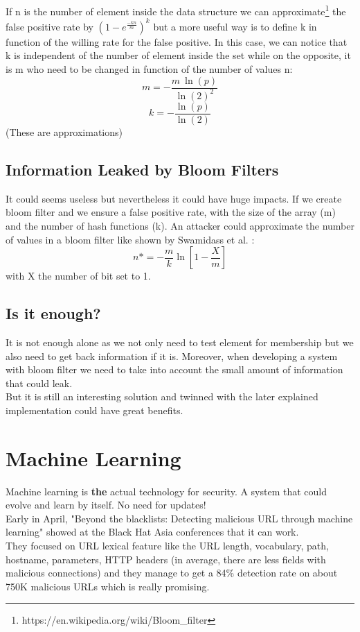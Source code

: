 \documentclass{eplmastersthesis}
\begin{document}
If n is the number of element inside the data structure we can approximate\footnote{https://en.wikipedia.org/wiki/Bloom\_filter} the false positive rate by $(1-e^{\frac{-kn}{m}})^k$ but a more useful way is to define k in function of the willing rate for the false positive. In this case, we can notice that k is independent of the number of element inside the set while on the opposite, it is m who need to be changed in function of the number of values n:
$$m = - \frac{m\ \ln(p)}{\ln(2)^2}$$
$$k = - \frac{\ln(p)}{\ln(2)}$$
(These are approximations)

\subsection{Information Leaked by Bloom Filters}
It could seems useless but nevertheless it could have huge impacts. If we create bloom filter and we ensure a false positive rate, with the size of the array (m) and the number of hash functions (k). An attacker could approximate the number of values in a bloom filter like shown by Swamidass et al. \cite{swamidass2007mathematical}:
$$n* = - \frac{m}{k} \ln\left[1 - \frac{X}{m}\right] $$
with X the number of bit set to 1.\\

\subsection{Is it enough?}
It is not enough alone as we not only need to test element for membership but we also need to get back information if it is. Moreover, when developing a system with bloom filter we need to take into account the small amount of information that could leak. \\
But it is still an interesting solution and twinned with the later explained implementation could have great benefits.

\section{Machine Learning}

Machine learning is \textbf{the} actual technology for security. A system that could evolve and learn by itself. No need for updates! \\
Early in April, "Beyond the blacklists: Detecting malicious URL through machine learning" showed at the Black Hat Asia conferences that it can work.\\
They focused on URL lexical feature like the URL length, vocabulary, path, hostname, parameters, HTTP headers (in average, there are less fields with malicious connections) and they manage to get a 84\% detection rate on about 750K malicious URLs which is really promising.\\
\end{document}
